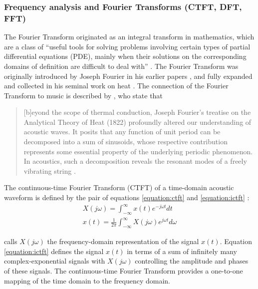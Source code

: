 \documentclass[report.tex]{subfiles}
\begin{document}
\subsubsection{Frequency analysis and Fourier Transforms (CTFT, DFT, FFT)}
\label{sec:freqanal}

The Fourier Transform originated as an integral transform in mathematics, which are a class of ``useful tools for solving problems involving certain types of partial differential equations (PDE), mainly when their solutions on the corresponding domains of definition are difficult to deal with'' \parencite[54]{fourierhistory}. The Fourier Transform was originally introduced by Joseph Fourier in his earlier papers \parencite{fourierhist1, fourierhist2}, and fully expanded and collected in his seminal work on heat \parencite{fourierheat}. The connection of the Fourier Transform to music is described by \citeauthor{fouriermusic}, who state that

\begin{quote}
	[b]eyond the scope of thermal conduction, Joseph Fourier's treatise on the Analytical Theory of Heat (1822) profoundly altered our understanding of acoustic waves. It posits that any function of unit period can be decomposed into a sum of sinusoids, whose respective contribution represents some essential property of the underlying periodic phenomenon. In acoustics, such a decomposition reveals the resonant modes of a freely vibrating string \parencite[461]{fouriermusic}.
\end{quote}

The continuous-time Fourier Transform (CTFT) of a time-domain acoustic waveform is defined by the pair of equations \eqref{equation:ctft} and \eqref{equation:ictft} \parencite[308]{dspfirst}:
\begin{align}
	X(j\omega) = \int_{-\infty}^{\infty}{x(t)e^{-j\omega t}\mathit{dt}} \tag{1}\label{equation:ctft} \\
	x(t) = \frac{1}{2\pi}\int_{-\infty}^{\infty}{X(j\omega)e^{j\omega t}\mathit{d\omega}} \tag{2}\label{equation:ictft}
\end{align}

\textcite{dspfirst} calls $X(j\omega)$ the frequency-domain representation of the signal $x(t)$. Equation \eqref{equation:ictft} defines the signal $x(t)$ in terms of a sum of infinitely many complex-exponential signals with $X(j\omega)$ controlling the amplitude and phases of these signals. The continuous-time Fourier Transform provides a one-to-one mapping of the time domain to the frequency domain.
\end{document}
